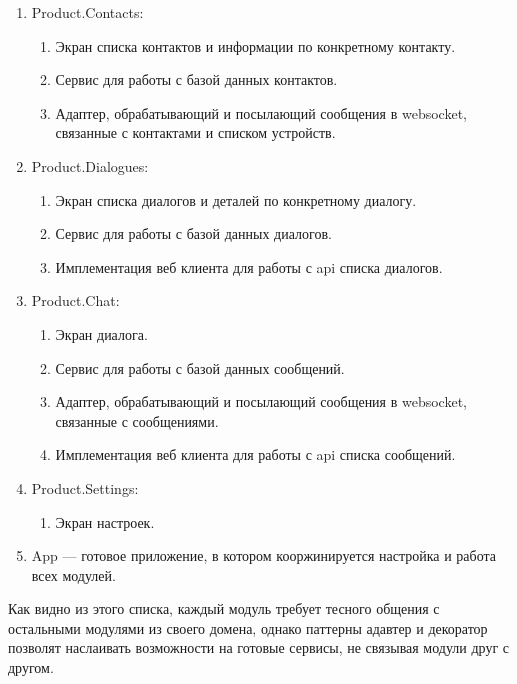 \begin{enumerate}
	\item Product.Contacts:
	\begin{enumerate}
		\item Экран списка контактов и информации по конкретному контакту.
		\item Сервис для работы с базой данных контактов.
		\item Адаптер, обрабатывающий и посылающий сообщения в websocket, связанные с контактами и списком устройств.
	\end{enumerate}

	\item Product.Dialogues:
	\begin{enumerate}
		\item Экран списка диалогов и деталей по конкретному диалогу.
		\item Сервис для работы с базой данных диалогов.
		\item Имплементация веб клиента для работы с \gls{api} списка диалогов.
	\end{enumerate}

	\item Product.Chat:
	\begin{enumerate}
		\item Экран диалога.
		\item Сервис для работы с базой данных сообщений.
		\item Адаптер, обрабатывающий и посылающий сообщения в websocket, связанные с сообщениями.
		\item Имплементация веб клиента для работы с \gls{api} списка сообщений.
	\end{enumerate}

	\item Product.Settings:
	\begin{enumerate}
		\item Экран настроек.
	\end{enumerate}

	\item App --- готовое приложение, в котором кооржинируется настройка и работа всех модулей.

\end{enumerate}

Как видно из этого списка, каждый модуль требует тесного общения с остальными модулями из своего домена, однако паттерны адавтер и декоратор позволят наслаивать возможности на готовые сервисы, не связывая модули друг с другом.
